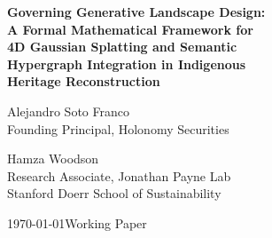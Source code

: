 \documentclass[11pt,a4paper]{article}
\theoremstyle{plain}
\theoremstyle{definition}
\theoremstyle{remark}
\begin{document}
\begin{center}
{\LARGE\bfseries
Governing Generative Landscape Design:\\[3pt]
A Formal Mathematical Framework for\\[3pt]
4D Gaussian Splatting and Semantic\\[3pt]
Hypergraph Integration in Indigenous\\[3pt]
Heritage Reconstruction}

\vspace{16pt}

{\large Alejandro Soto Franco}\\[2pt]
{\small Founding Principal, Holonomy Securities}

\vspace{8pt}

{\large Hamza Woodson}\\[2pt]
{\small Research Associate, Jonathan Payne Lab\\
Stanford Doerr School of Sustainability}

\vspace{10pt}

{\small\today\quad\textperiodcentered\quad Working Paper}
\end{center}
\thispagestyle{firstpage}

\vspace{6pt}
\end{document}
